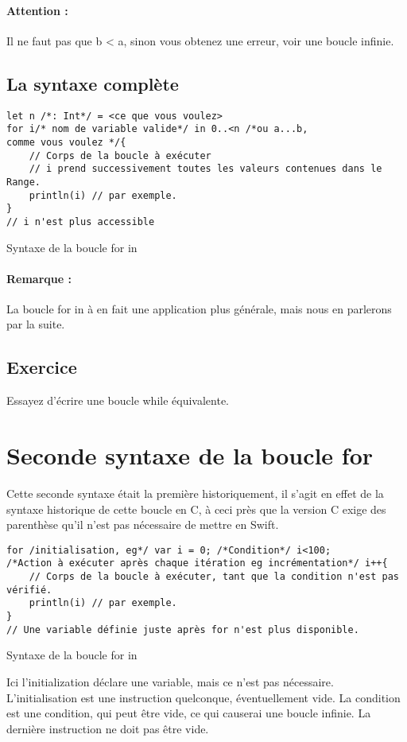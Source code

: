 \paragraph{Attention :}
Il ne faut pas que b < a, sinon vous obtenez une erreur, voir une boucle infinie. 
\subsection{La syntaxe complète}
\begin{listing}[h]
\begin{verbatim}
let n /*: Int*/ = <ce que vous voulez>
for i/* nom de variable valide*/ in 0..<n /*ou a...b,
comme vous voulez */{
    // Corps de la boucle à exécuter
    // i prend successivement toutes les valeurs contenues dans le Range.
    println(i) // par exemple.
}
// i n'est plus accessible
\end{verbatim}
\caption{Syntaxe de la boucle for in}
\end{listing}
\paragraph{Remarque :}
La boucle for in à en fait une application plus générale, mais nous en parlerons par la suite. %
\subsection{Exercice}
Essayez d'écrire une boucle while équivalente.

\section{Seconde syntaxe de la boucle for}
Cette seconde syntaxe était la première historiquement,
il s'agit en effet de la syntaxe historique de cette boucle en C,
à ceci près que la version C exige des parenthèse
qu'il n'est pas nécessaire de mettre en Swift.

\begin{listing}[h]
\begin{verbatim}
for /initialisation, eg*/ var i = 0; /*Condition*/ i<100;
/*Action à exécuter après chaque itération eg incrémentation*/ i++{
    // Corps de la boucle à exécuter, tant que la condition n'est pas vérifié.
    println(i) // par exemple.
}
// Une variable définie juste après for n'est plus disponible.
\end{verbatim}
\caption{Syntaxe de la boucle for in}
\end{listing}
Ici l'initialization déclare une variable,
mais ce n'est pas nécessaire.
L'initialisation est une instruction quelconque, éventuellement vide.
La condition est une condition, qui peut être vide, ce qui causerai une boucle infinie.
La dernière instruction ne doit pas être vide.
